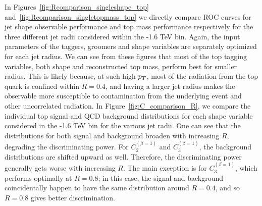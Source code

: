 In Figures~\ref{fig:Rcomparison_singleshape_top} and~\ref{fig:Rcomparison_singletopmass_top} we directly compare ROC curves for jet shape observable performance and top mass performance respectively for the three different jet radii considered within the -1.6 TeV bin. Again, the input parameters of the taggers, groomers and shape variables are separately optimized for each jet radius. We can see from these figures that most of the top tagging variables, both shape and reconstructed top mass, perform best for smaller radius. This is likely because, at such high $p_T$, most of the radiation from the top quark is confined within $R=0.4$, and having a larger jet radius makes the observable more susceptible to contamination from the underlying event and other uncorrelated radiation. In Figure~\ref{fig:C_comparison_R}, we compare the individual top signal and QCD background distributions for each shape variable considered in the -1.6 TeV bin for the various jet radii. One can see that the distributions for both signal and background broaden with increasing $R$, degrading the discriminating power. For $C_2^{(\beta=1)}$ and $C_3^{(\beta=1)}$, the background distributions are shifted upward as well. Therefore, the discriminating power generally gets worse with increasing $R$. The main exception is   for $C_3^{(\beta=1)}$, which performs optimally at $R=0.8$; in this case, the signal and background coincidentally happen to have the same distribution around $R=0.4$, and so $R=0.8$ gives better discrimination.



